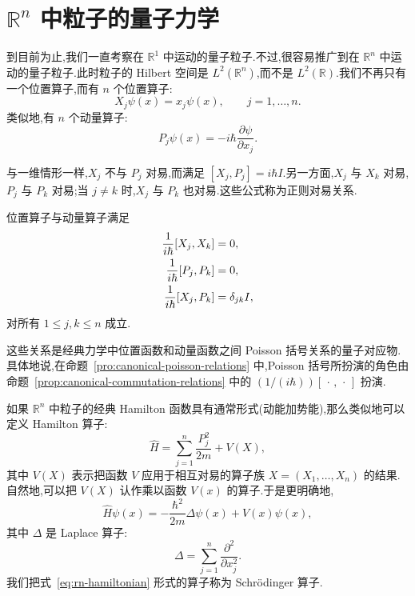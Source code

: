 \section{\(\mathbb{R}^{n}\) 中粒子的量子力学}\label{sec:quantum-particle-rn}

到目前为止,我们一直考察在 \(\mathbb{R}^{1}\) 中运动的量子粒子.不过,很容易推广到在 \(\mathbb{R}^{n}\) 中运动的量子粒子.此时粒子的 Hilbert 空间是 \(L^{2}(\mathbb{R}^{n})\),而不是 \(L^{2}(\mathbb{R})\).我们不再只有一个位置算子,而有 \(n\) 个位置算子:
\[
X_{j}\psi(x)=x_{j}\psi(x),\qquad j=1,\ldots,n.
\]
类似地,有 \(n\) 个动量算子:
\[
P_{j}\psi(x)=-i\hbar\frac{\partial\psi}{\partial x_{j}}.
\]

与一维情形一样,\(X_{j}\) 不与 \(P_{j}\) 对易,而满足 \([X_{j},P_{j}]=i\hbar I\).另一方面,\(X_{j}\) 与 \(X_{k}\) 对易,\(P_{j}\) 与 \(P_{k}\) 对易;当 \(j\ne k\) 时,\(X_{j}\) 与 \(P_{k}\) 也对易.这些公式称为正则对易关系.

\begin{proposition}[正则对易关系]\label{prop:canonical-commutation-relations}
位置算子与动量算子满足
\begin{align}
\frac{1}{i\hbar}[X_{j},X_{k}]&=0,\notag\\
\frac{1}{i\hbar}[P_{j},P_{k}]&=0,\notag\\
\frac{1}{i\hbar}[X_{j},P_{k}]&=\delta_{jk}I,\label{eq:canonical-commutation-relations}
\end{align}
对所有 \(1\le j,k\le n\) 成立.
\end{proposition}

这些关系是经典力学中位置函数和动量函数之间 Poisson 括号关系的量子对应物.具体地说,在命题~\ref{pro:canonical-poisson-relations} 中,Poisson 括号所扮演的角色由命题~\ref{prop:canonical-commutation-relations} 中的 \((1/(i\hbar))[\,\cdot\,,\,\cdot\,]\) 扮演.

如果 \(\mathbb{R}^{n}\) 中粒子的经典 Hamilton 函数具有通常形式(动能加势能),那么类似地可以定义 Hamilton 算子:
\begin{equation}
\widehat H=\sum_{j=1}^{n}\frac{P_{j}^{2}}{2m}+V(X),
\label{eq:rn-hamiltonian}
\end{equation}
其中 \(V(X)\) 表示把函数 \(V\) 应用于相互对易的算子族 \(X=(X_{1},\ldots,X_{n})\) 的结果.自然地,可以把 \(V(X)\) 认作乘以函数 \(V(x)\) 的算子.于是更明确地,
\[
\widehat H\psi(x)=-\frac{\hbar^{2}}{2m}\Delta\psi(x)+V(x)\psi(x),
\]
其中 \(\Delta\) 是 Laplace 算子:
\[
\Delta=\sum_{j=1}^{n}\frac{\partial^{2}}{\partial x_{j}^{2}}.
\]
我们把式~\eqref{eq:rn-hamiltonian} 形式的算子称为 Schrödinger 算子.

